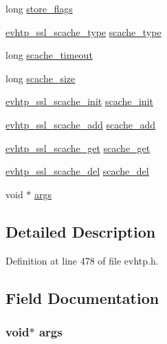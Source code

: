 \begin{DoxyCompactItemize}
\item 
long \hyperlink{structevhtp__ssl__cfg__s_ad15d9e1280fb922732799e92fa24ba2a}{store\-\_\-flags}
\item 
\hyperlink{evhtp_8h_ab478739101b89e04a6583b835033f998}{evhtp\-\_\-ssl\-\_\-scache\-\_\-type} \hyperlink{structevhtp__ssl__cfg__s_ae30daad1d680d19dc75f4c29e56b3430}{scache\-\_\-type}
\item 
long \hyperlink{structevhtp__ssl__cfg__s_a32dceaa2f20a1c9f617b4025845feff8}{scache\-\_\-timeout}
\item 
long \hyperlink{structevhtp__ssl__cfg__s_ae2e14ee7309cb5910c05d6a728fa276c}{scache\-\_\-size}
\item 
\hyperlink{evhtp_8h_acc2a1492a21e87e24e46b8105ce16af5}{evhtp\-\_\-ssl\-\_\-scache\-\_\-init} \hyperlink{structevhtp__ssl__cfg__s_a9a8bc5976342f1f9f6670df6aa2421d2}{scache\-\_\-init}
\item 
\hyperlink{evhtp_8h_a88e4d535033e8110eb232e2f9f8afbc6}{evhtp\-\_\-ssl\-\_\-scache\-\_\-add} \hyperlink{structevhtp__ssl__cfg__s_a3b1adda2604e2f06fcf871690d83316b}{scache\-\_\-add}
\item 
\hyperlink{evhtp_8h_aa0fab8ce3ec339ff62a366be3c3a6af9}{evhtp\-\_\-ssl\-\_\-scache\-\_\-get} \hyperlink{structevhtp__ssl__cfg__s_aaaec9de37c98a03578c9a6c20de897ad}{scache\-\_\-get}
\item 
\hyperlink{evhtp_8h_a0850d66a9f1a8f87da1771a8b5deb691}{evhtp\-\_\-ssl\-\_\-scache\-\_\-del} \hyperlink{structevhtp__ssl__cfg__s_a040f341668db7112bb0bec3fa2ee3828}{scache\-\_\-del}
\item 
void $\ast$ \hyperlink{structevhtp__ssl__cfg__s_add0eb34e0cef9e763462cf9080f9be0a}{args}
\end{DoxyCompactItemize}


\subsection{\-Detailed \-Description}


\-Definition at line 478 of file evhtp.\-h.



\subsection{\-Field \-Documentation}
\hypertarget{structevhtp__ssl__cfg__s_add0eb34e0cef9e763462cf9080f9be0a}{
\subsubsection[{args}]{\setlength{\rightskip}{0pt plus 5cm}void$\ast$ {\bf args}}}\label{structevhtp__ssl__cfg__s_add0eb34e0cef9e763462cf9080f9be0a}


